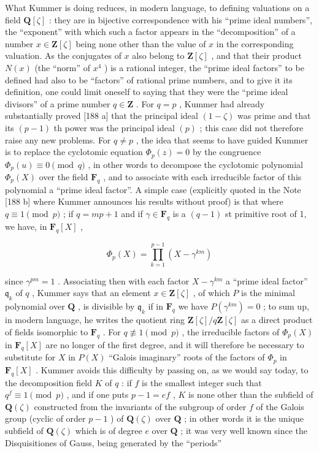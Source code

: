 What Kummer is doing reduces, in modern language, to defining valuations on a field \(\mathbf{Q}[\zeta]\) : they are in bijective correspondence with his ``prime ideal numbers'', the ``exponent'' with which such a factor appears in the ``decomposition'' of a number \(x \in \mathbf{Z}[\zeta]\) being none other than the value of \(x\) in the corresponding valuation. As the conjugates of \(x\) also belong to \(\mathbf{Z}[\zeta]\) , and that their product \(N(x)\) (the ``norm'' of \(x\)\(^{4}\) ) is a rational integer, the ``prime ideal factors'' to be defined had also to be ``factors'' of rational prime numbers, and to give it its definition, one could limit oneself to saying that they were the ``prime ideal divisors'' of a prime number \(q \in \mathbf{Z}\) . For \(q = p\) , Kummer had already substantially proved {[}188 a{]} that the principal ideal \((1 - \zeta)\) was prime and that its \((p - 1)\) th power was the principal ideal \((p)\) ; this case did not therefore raise any new problems. For \(q \neq p\) , the idea that seems to have guided Kummer is to replace the cyclotomic equation \(\Phi_p(z) = 0\) by the congruence \(\Phi_p(u) \equiv 0 \pmod{q}\) , in other words to decompose the cyclotomic polynomial \(\Phi_p(X)\) over the field \(\mathbf{F}_q\) , and to associate with each irreducible factor of this polynomial a ``prime ideal factor''. A simple case (explicitly quoted in the Note {[}188 b{]} where Kummer announces his results without proof) is that where \(q \equiv 1 \pmod{p}\) ; if \(q = mp + 1\) and if \(\gamma \in \mathbf{F}_q\) is a \((q - 1)\) st primitive root of 1, we have, in \(\mathbf{F}_q[X]\) ,

\[
\Phi_ {p} (X) = \prod_ {k = 1} ^ {p - 1} (X - \gamma^ {k m})
\]

since \(\gamma^{pm} = 1\) . Associating then with each factor \(X - \gamma^{km}\) a ``prime ideal factor'' \(\mathfrak{q}_k\) of \(q\) , Kummer says that an element \(x \in \mathbf{Z}[\zeta]\) , of which \(P\) is the minimal polynomial over \(\mathbf{Q}\) , is divisible by \(\mathfrak{q}_k\) if in \(\mathbf{F}_q\) we have \(P(\gamma^{km}) = 0\) ; to sum up, in modern language, he writes the quotient ring \(\mathbf{Z}[\zeta]/q\mathbf{Z}[\zeta]\) as a direct product of fields isomorphic to \(\mathbf{F}_q\) . For \(q \not\equiv 1 \pmod{p}\) , the irreducible factors of \(\Phi_p(X)\) in \(\mathbf{F}_q[X]\) are no longer of the first degree, and it will therefore be necessary to substitute for \(X\) in \(P(X)\) ``Galois imaginary'' roots of the factors of \(\Phi_p\) in \(\mathbf{F}_q[X]\) . Kummer avoids this difficulty by passing on, as we would say today, to the decomposition field \(K\) of \(q\) : if \(f\) is the smallest integer such that \(q^f \equiv 1 \pmod{p}\) , and if one puts \(p-1 = ef\) , \(K\) is none other than the subfield of \(\mathbf{Q}(\zeta)\) constructed from the invariants of the subgroup of order \(f\) of the Galois group (cyclic of order \(p-1\) ) of \(\mathbf{Q}(\zeta)\) over \(\mathbf{Q}\) ; in other words it is the unique subfield of \(\mathbf{Q}(\zeta)\) which is of degree \(e\) over \(\mathbf{Q}\) ; it was very well known since the Disquisitiones of Gauss, being generated by the ``periods''

